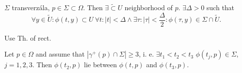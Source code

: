 \documentclass[12pt]{article}					%
\begin{document}
\begin{lemma}
	$\Sigma$ transverzála, $p \in \Sigma \subset \Omega$. Then $\exists \tilde \subset U$ neighborhood of $p$. $\exists \Delta > 0$ such that
	$$ \forall y \in \tilde U: \phi(t, y) \subset U\ \forall t: |t| < \Delta \land \exists \tau: |\tau| < \frac{\Delta}{2}: \phi(\tau, y) \in \Sigma \cap \tilde U. $$

	\begin{dukazin}
		Use Th. of rect.
	\end{dukazin}
\end{lemma}

\begin{lemma}
	Let $p \in \Omega$ and assume that $|\gamma^+(p) \cap \Sigma| ≥ 3$, i. e. $\exists t_1 < t_2 < t_3$ $\phi(t_j, p) \in \Sigma$, $j=1, 2, 3$. Then $\phi(t_2, p)$ lie between $\phi(t, p)$ and $\phi(t_3, p)$.
\end{lemma}
\end{document}
